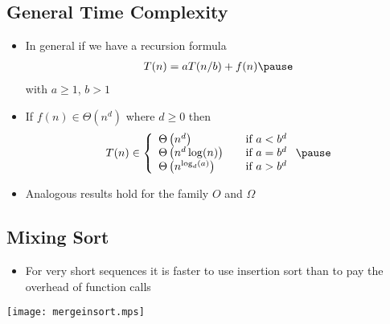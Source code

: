 
\begin{slide}
\section[-1.5]{General Time Complexity}

\begin{PauseHighLight}
  \begin{itemize}
  \item In general if we have a recursion formula
    \begin{align*}
      T(n) = a T(n/b) + f(n)\pause
    \end{align*}
    with $a\geq1$, $b>1$\pause
  \item If $f(n) \in \Theta(n^d)$ where $d\geq 0$ then
    \begin{align*}
      T(n) \in \left\{
        \begin{array}{lll}
          \Theta\left(n^d \right) & & \mbox{if $a<b^d$} \\
          \Theta\left(n^d \log(n)\right) & & \mbox{if $a=b^d$} \\
          \Theta\left(n^{\log_d(a)}\right) & & \mbox{if $a>b^d$}
        \end{array}\right.\pause
    \end{align*}
  \item Analogous results hold for the family $O$ and $\Omega$\pause
  \end{itemize}
\end{PauseHighLight}
\end{slide}


\begin{slide}
\section[-2]{Mixing Sort}

\begin{PauseHighLight}
  \begin{itemize}
  \item For very short sequences it is faster to use insertion sort than
  to pay the overhead of function calls\pause
  \end{itemize}
  \begin{center}\color{TextColor}
    \texttt{[image: mergeinsort.mps]}\pause
  \end{center}
\end{PauseHighLight}

\end{slide}


